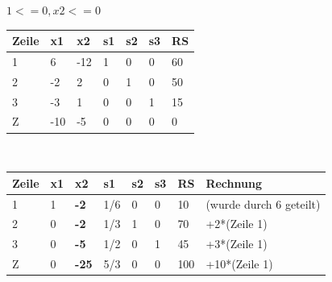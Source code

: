 \begin{math}1 <= 0, x2 <= 0 \end{math}\\
\begin{table}[h]
\begin{tabular}{|l|l|l|l|l|l|l|}
\hline
\rowcolor[HTML]{C0C0C0} 
Zeile                     & x1                         & x2                          & s1                        & s2                        & s3                        & RS \\ \hline
\cellcolor[HTML]{C0C0C0}1 & \cellcolor[HTML]{96FFFB}6  & \cellcolor[HTML]{FFFFFF}-12 & \cellcolor[HTML]{FFFFFF}1 & \cellcolor[HTML]{FFFFFF}0 & \cellcolor[HTML]{FFFFFF}0 & 60 \\ \hline
\cellcolor[HTML]{C0C0C0}2 & \cellcolor[HTML]{FFFFFF}-2 & \cellcolor[HTML]{FFFFFF}2   & \cellcolor[HTML]{FFFFFF}0 & \cellcolor[HTML]{FFFFFF}1 & \cellcolor[HTML]{FFFFFF}0 & 50 \\ \hline
\cellcolor[HTML]{C0C0C0}3 & \cellcolor[HTML]{FFFFFF}-3 & \cellcolor[HTML]{FFFFFF}1   & \cellcolor[HTML]{FFFFFF}0 & \cellcolor[HTML]{FFFFFF}0 & \cellcolor[HTML]{FFFFFF}1 & 15 \\ \hline
\cellcolor[HTML]{C0C0C0}Z & -10                        & -5                          & 0                         & 0                         & 0                         & 0  \\ \hline
\end{tabular}
\end{table}
\\
\begin{table}[!ht]
\begin{tabular}{|l|l|l|l|l|l|l|l|}
\hline
\rowcolor[HTML]{C0C0C0} 
Zeile                     & x1                        & x2                                  & s1                          & s2                        & s3                        & RS  & Rechnung                \\ \hline
\cellcolor[HTML]{C0C0C0}1 & \cellcolor[HTML]{FFFFFF}1 & \cellcolor[HTML]{FFFFFF}\textbf{-2} & \cellcolor[HTML]{FFFFFF}1/6 & \cellcolor[HTML]{FFFFFF}0 & \cellcolor[HTML]{FFFFFF}0 & 10  & (wurde durch 6 geteilt) \\ \hline
\cellcolor[HTML]{C0C0C0}2 & \cellcolor[HTML]{FFFFFF}0 & \cellcolor[HTML]{FFFFFF}\textbf{-2} & \cellcolor[HTML]{FFFFFF}1/3 & \cellcolor[HTML]{FFFFFF}1 & \cellcolor[HTML]{FFFFFF}0 & 70  & +2*(Zeile 1)            \\ \hline
\cellcolor[HTML]{C0C0C0}3 & \cellcolor[HTML]{FFFFFF}0 & \cellcolor[HTML]{FFFFFF}\textbf{-5} & \cellcolor[HTML]{FFFFFF}1/2 & \cellcolor[HTML]{FFFFFF}0 & \cellcolor[HTML]{FFFFFF}1 & 45  & +3*(Zeile 1)            \\ \hline
\cellcolor[HTML]{C0C0C0}Z & 0                         & \textbf{-25}                        & 5/3                         & 0                         & 0                         & 100 & +10*(Zeile 1)           \\ \hline
\end{tabular}
\end{table}
